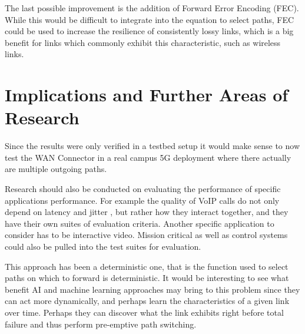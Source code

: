 The last possible improvement is the addition of Forward Error Encoding (FEC). While this would be difficult to integrate into the equation to select paths, FEC could be used to increase the resilience of consistently lossy links, which is a big benefit for links which commonly exhibit this characteristic, such as wireless links.

\section{Implications and Further Areas of Research}
\label{sec:implications}

Since the results were only verified in a testbed setup it would make sense to now test the WAN Connector in a real campus 5G deployment where there actually are multiple outgoing paths.

Research should also be conducted on evaluating the performance of specific applications performance. For example the quality of VoIP calls do not only depend on latency and jitter \cite{voip-measurement}, but rather how they interact together, and they have their own suites of evaluation criteria. Another specific application to consider has to be interactive video. Mission critical as well as control systems could also be pulled into the test suites for evaluation.

This approach has been a deterministic one, that is the function used to select paths on which to forward is deterministic. It would be interesting to see what benefit AI and machine learning approaches may bring to this problem since they can act more dynamically, and perhaps learn the characteristics of a given link over time. Perhaps they can discover what the link exhibits right before total failure and thus perform pre-emptive path switching.